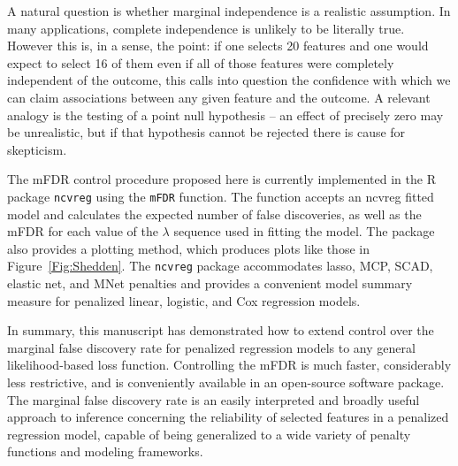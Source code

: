 A natural question is whether marginal independence is a realistic assumption.  In many applications, complete independence is unlikely to be literally true.  However this is, in a sense, the point: if one selects 20 features and one would expect to select 16 of them even if all of those features were completely independent of the outcome, this calls into question the confidence with which we can claim associations between any given feature and the outcome.  A relevant analogy is the testing of a point null hypothesis -- an effect of precisely zero may be unrealistic, but if that hypothesis cannot be rejected there is cause for skepticism.

The mFDR control procedure proposed here is currently implemented in the R package {\tt ncvreg} \citep{Breheny2011} using the {\tt mFDR} function. The function accepts an ncvreg fitted model and calculates the expected number of false discoveries, as well as the mFDR for each value of the $\lambda$ sequence used in fitting the model.  The package also provides a plotting method, which produces plots like those in Figure~\ref{Fig:Shedden}.  The {\tt ncvreg} package accommodates lasso, MCP, SCAD, elastic net, and MNet \citep{Huang2016} penalties and provides a convenient model summary measure for penalized linear, logistic, and Cox regression models.

In summary, this manuscript has demonstrated how to extend control over the marginal false discovery rate for penalized regression models to any general likelihood-based loss function.  Controlling the mFDR is much faster, considerably less restrictive, and is conveniently available in an open-source software package.  The marginal false discovery rate is an easily interpreted and broadly useful approach to inference concerning the reliability of selected features in a penalized regression model, capable of being generalized to a wide variety of penalty functions and modeling frameworks.
